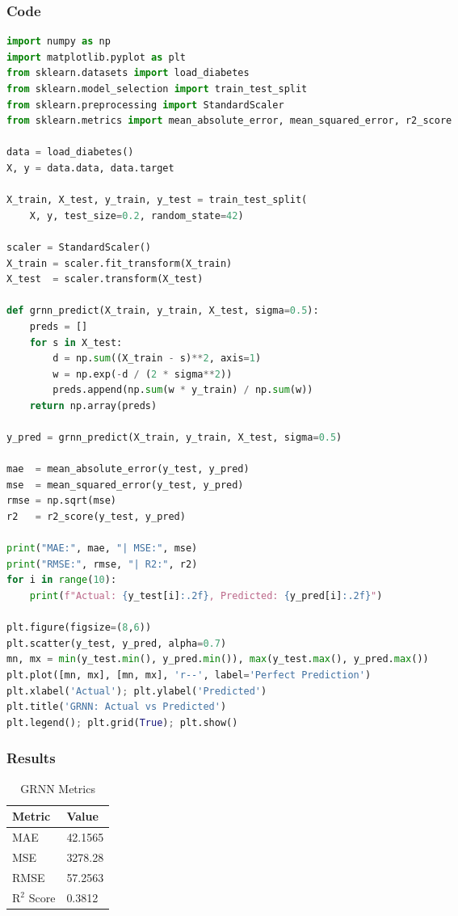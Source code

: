 \documentclass[a4paper,10pt]{article}
\begin{document}
\subsubsection{Code}
\begin{lstlisting}[language=Python, caption={GRNN Implementation}]
import numpy as np
import matplotlib.pyplot as plt
from sklearn.datasets import load_diabetes
from sklearn.model_selection import train_test_split
from sklearn.preprocessing import StandardScaler
from sklearn.metrics import mean_absolute_error, mean_squared_error, r2_score

data = load_diabetes()
X, y = data.data, data.target

X_train, X_test, y_train, y_test = train_test_split(
    X, y, test_size=0.2, random_state=42)

scaler = StandardScaler()
X_train = scaler.fit_transform(X_train)
X_test  = scaler.transform(X_test)

def grnn_predict(X_train, y_train, X_test, sigma=0.5):
    preds = []
    for s in X_test:
        d = np.sum((X_train - s)**2, axis=1)
        w = np.exp(-d / (2 * sigma**2))
        preds.append(np.sum(w * y_train) / np.sum(w))
    return np.array(preds)

y_pred = grnn_predict(X_train, y_train, X_test, sigma=0.5)

mae  = mean_absolute_error(y_test, y_pred)
mse  = mean_squared_error(y_test, y_pred)
rmse = np.sqrt(mse)
r2   = r2_score(y_test, y_pred)

print("MAE:", mae, "| MSE:", mse)
print("RMSE:", rmse, "| R2:", r2)
for i in range(10):
    print(f"Actual: {y_test[i]:.2f}, Predicted: {y_pred[i]:.2f}")

plt.figure(figsize=(8,6))
plt.scatter(y_test, y_pred, alpha=0.7)
mn, mx = min(y_test.min(), y_pred.min()), max(y_test.max(), y_pred.max())
plt.plot([mn, mx], [mn, mx], 'r--', label='Perfect Prediction')
plt.xlabel('Actual'); plt.ylabel('Predicted')
plt.title('GRNN: Actual vs Predicted')
plt.legend(); plt.grid(True); plt.show()
\end{lstlisting}

\subsubsection{Results}
\begin{table}[H]
\centering
\caption{GRNN Metrics}
\begin{tabular}{ll}
\toprule
\textbf{Metric} & \textbf{Value} \\
\midrule
MAE & 42.1565 \\
MSE & 3278.28 \\
RMSE & 57.2563 \\
R\(^2\) Score & 0.3812 \\
\bottomrule
\end{tabular}
\end{table}
\end{document}
